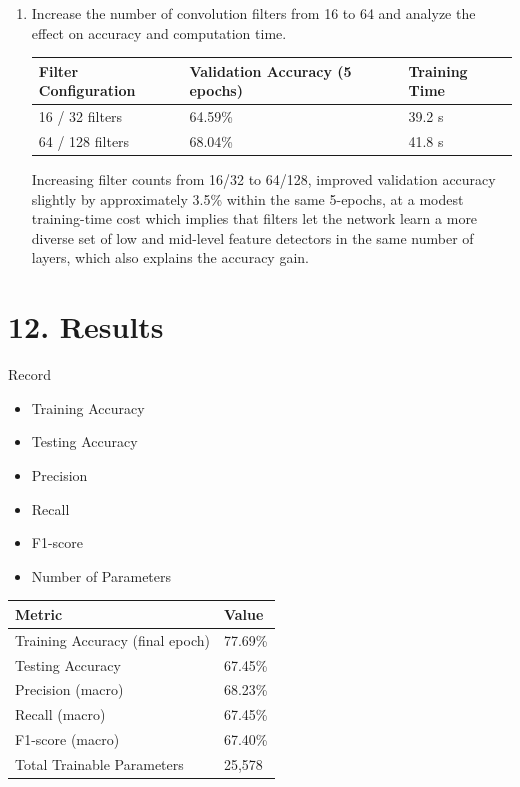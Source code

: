 \documentclass[11pt]{article}
\begin{document}
\begin{enumerate}
\item Increase the number of convolution filters from 16 to 64 and analyze the effect on accuracy and computation time.

\begin{center}
\begin{tabular}{|l|l|l|}
\hline
\textbf{Filter Configuration} & \textbf{Validation Accuracy (5 epochs)} & \textbf{Training Time}\\
\hline
16 / 32 filters & 64.59\% & 39.2 s\\
\hline
64 / 128 filters & 68.04\% & 41.8 s\\
\hline
\end{tabular}
\end{center}

Increasing filter counts from 16/32 to 64/128, improved validation accuracy slightly by approximately 3.5\% within the same 5-epochs, at a modest training-time cost which implies that filters let the network learn a more diverse set of low and mid-level feature detectors in the same number of layers, which also explains the accuracy gain.

\end{enumerate}

\section*{12. Results}

Record

\begin{itemize}
\item Training Accuracy
\item Testing Accuracy
\item Precision
\item Recall
\item F1-score
\item Number of Parameters
\end{itemize}

\begin{center}
\begin{tabular}{|l|l|}
\hline
\textbf{Metric} & \textbf{Value}\\
\hline
Training Accuracy (final epoch) & 77.69\%\\
\hline
Testing Accuracy & 67.45\%\\
\hline
Precision (macro) & 68.23\%\\
\hline
Recall (macro) & 67.45\%\\
\hline
F1-score (macro) & 67.40\%\\
\hline
Total Trainable Parameters & 25,578\\
\hline
\end{tabular}
\end{center}
\end{document}
